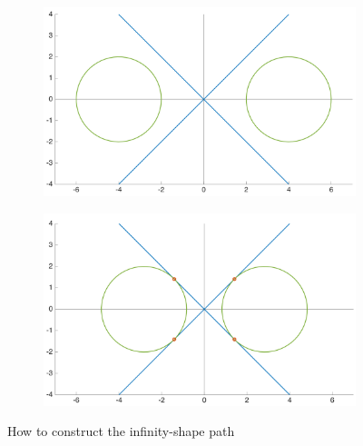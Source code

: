 \begin{figure}[!htbp]
 \centering
   \begin{subfigure}[b]{0.45\textwidth}
     \includegraphics[width=\textwidth]{img/constructionshape1_.png}
        \label{fig:constuctinfinity1}
   \end{subfigure}
   \hfill
   \begin{subfigure}[b]{0.45\textwidth}
     \includegraphics[width=\textwidth]{img/constructionshape2_.png}
       \label{fig:constuctinfinity2}
   \end{subfigure}
   \caption{How to construct the infinity-shape path}
   \label{fig:constuctinfinity}
 \end{figure} 
  

